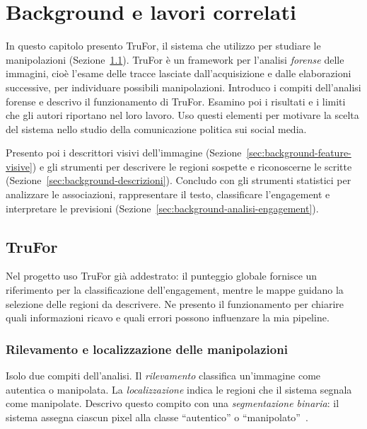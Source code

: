 
\chapter{Background e lavori correlati}
\label{chap:background}

In questo capitolo presento TruFor, il sistema che utilizzo per studiare le manipolazioni (Sezione~\ref{sec:background-trufor}). TruFor è un framework per l'analisi \emph{forense} delle immagini, cioè l'esame delle tracce lasciate dall'acquisizione e dalle elaborazioni successive, per individuare possibili manipolazioni. Introduco i compiti dell'analisi forense e descrivo il funzionamento di TruFor. Esamino poi i risultati e i limiti che gli autori riportano nel loro lavoro. Uso questi elementi per motivare la scelta del sistema nello studio della comunicazione politica sui social media.

Presento poi i descrittori visivi dell'immagine (Sezione~\ref{sec:background-feature-visive}) e gli strumenti per descrivere le regioni sospette e riconoscerne le scritte (Sezione~\ref{sec:background-descrizioni}). Concludo con gli strumenti statistici per analizzare le associazioni, rappresentare il testo, classificare l'engagement e interpretare le previsioni (Sezione~\ref{sec:background-analisi-engagement}).

\section{TruFor}
\label{sec:background-trufor}

Nel progetto uso TruFor già addestrato: il punteggio globale fornisce un riferimento per la classificazione dell'engagement, mentre le mappe guidano la selezione delle regioni da descrivere. Ne presento il funzionamento per chiarire quali informazioni ricavo e quali errori possono influenzare la mia pipeline.

\subsection{Rilevamento e localizzazione delle manipolazioni}
\label{subsec:background-rilevamento-localizzazione}

Isolo due compiti dell'analisi. Il \emph{rilevamento} classifica un'immagine come autentica o manipolata. La \emph{localizzazione} indica le regioni che il sistema segnala come manipolate. Descrivo questo compito con una \emph{segmentazione binaria}: il sistema assegna ciascun pixel alla classe ``autentico'' o ``manipolato''~\cite{Guillaro_2023_CVPR}.

